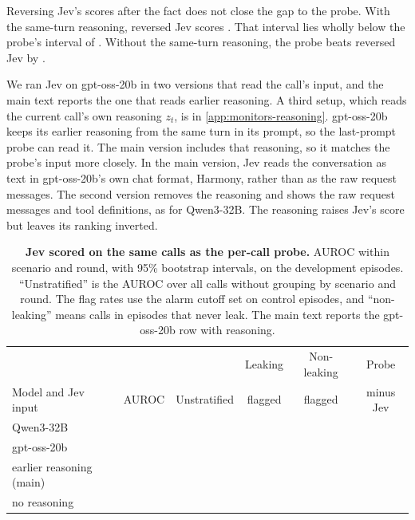 Reversing Jev's scores after the fact does not close the gap to the probe.
With the same-turn reasoning, reversed Jev scores \gptossCallJevReversed{} \gptossCallJevReversedCI{}.
That interval lies wholly below the probe's interval of \gptossCallProbeCI{}.
Without the same-turn reasoning, the probe beats reversed Jev by \gptossCallProbeMinusJevNoReasoningReversed{} \gptossCallProbeMinusJevNoReasoningReversedCI{}.

We ran Jev on gpt-oss-20b in two versions that read the call's input, and the main text reports the one that reads earlier reasoning. A third setup, which reads the current call's own reasoning $z_t$, is in \cref{app:monitors-reasoning}.
gpt-oss-20b keeps its earlier reasoning from the same turn in its prompt, so the last-prompt probe can read it.
The main version includes that reasoning, so it matches the probe's input more closely.
In the main version, Jev reads the conversation as text in gpt-oss-20b's own chat format, Harmony, rather than as the raw request messages.
The second version removes the reasoning and shows the raw request messages and tool definitions, as for Qwen3-32B.
The reasoning raises Jev's score but leaves its ranking inverted.

\begin{table}[h]
  \centering
  \small
  \begin{tabular}{@{}lccccc@{}}
    \toprule
    & & & Leaking & Non-leaking & Probe \\
    Model and Jev input & AUROC & Unstratified & flagged & flagged & minus Jev \\
    \midrule
    Qwen3-32B & \qwenCallJev{} \qwenCallJevCI{} & \qwenCallJevUnstratified{} & \qwenCallJevLeakFlagged{} & \qwenCallJevRefusingFlagged{} & \qwenCallProbeMinusJev{} \qwenCallProbeMinusJevCI{} \\
    gpt-oss-20b & & & & & \\
    \quad earlier reasoning (main) & \gptossCallJev{} \gptossCallJevCI{} & \gptossCallJevUnstratified{} & \gptossCallJevLeakFlagged{} & \gptossCallJevRefusingFlagged{} & \gptossCallProbeMinusJev{} \gptossCallProbeMinusJevCI{} \\
    \quad no reasoning & \gptossCallJevNoReasoning{} \gptossCallJevNoReasoningCI{} & \gptossCallJevNoReasoningUnstratified{} & \gptossCallJevNoReasoningLeakFlagged{} & \gptossCallJevNoReasoningRefusingFlagged{} & \gptossCallProbeMinusJevNoReasoning{} \gptossCallProbeMinusJevNoReasoningCI{} \\
    \bottomrule
  \end{tabular}
  \caption{\textbf{Jev scored on the same calls as the per-call probe.} AUROC within scenario and round, with 95\% bootstrap intervals, on the development episodes. ``Unstratified'' is the AUROC over all calls without grouping by scenario and round. The flag rates use the alarm cutoff set on control episodes, and ``non-leaking'' means calls in episodes that never leak. The main text reports the gpt-oss-20b row with reasoning.}
  \label{tab:monitor-percall}
\end{table}

